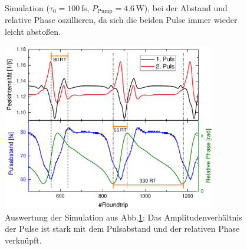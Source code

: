 \documentclass[bachelor,       %
               twoside,        %
               BCOR10mm,       %
               liststotoc,nomtotoc,bibtotoc, %
               english,ngerman, %
               final,          %
               ]{GAUBM}
\begin{document}
\begin{figure}[!htb]
   \centering
   \hfill
   \caption{Simulation ($\tau_0=100\,$fs, $P_\text{Pump}=4.6\,$W), bei der Abstand und relative Phase oszillieren, da sich die beiden Pulse immer wieder leicht abstoßen.}
   \label{fig:SimulationOscillation}
\end{figure}

\begin{figure}[!htb]
	\centering
	\includegraphics[width=0.83\textwidth]{figures/SimRBOszi1}
	\caption{Auswertung der Simulation aus Abb.\ref{fig:SimulationOscillation}: Das Amplitudenverhältnis der Pulse ist stark mit dem Pulsabstand und der relativen Phase verknüpft.}
	\label{fig:SimRBOszi}
\end{figure}
\end{document}
